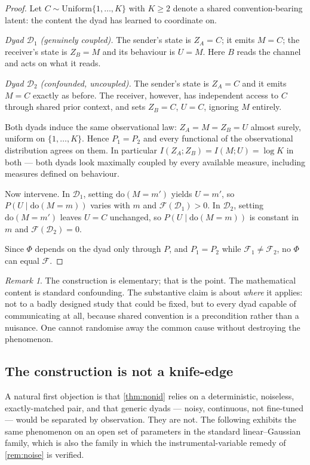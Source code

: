 \documentclass[11pt,a4paper]{article}
\theoremstyle{plain}
\theoremstyle{definition}
\theoremstyle{remark}
\newtheorem{remark}[remark]{Remark}
\newcommand{\Fc}{\mathcal{F}}
\newcommand{\Dy}{\mathcal{D}}
\newcommand{\dop}{\mathrm{do}}
\begin{document}
\begin{proof}
Let $C \sim \mathrm{Uniform}\{1,\dots,K\}$ with $K \geq 2$ denote a shared convention-bearing
latent: the content the dyad has learned to coordinate on.

\emph{Dyad $\Dy_1$ (genuinely coupled).} The sender's state is $Z_A = C$; it emits $M = C$;
the receiver's state is $Z_B = M$ and its behaviour is $U = M$. Here $B$ reads the channel and
acts on what it reads.

\emph{Dyad $\Dy_2$ (confounded, uncoupled).} The sender's state is $Z_A = C$ and it emits
$M = C$ exactly as before. The receiver, however, has independent access to $C$ through shared
prior context, and sets $Z_B = C$, $U = C$, ignoring $M$ entirely.

Both dyads induce the same observational law: $Z_A = M = Z_B = U$ almost surely, uniform on
$\{1,\dots,K\}$. Hence $P_1 = P_2$ and every functional of the observational distribution
agrees on them. In particular $I(Z_A;Z_B) = I(M;U) = \log K$ in both --- both dyads look
maximally coupled by every available measure, including measures defined on behaviour.

Now intervene. In $\Dy_1$, setting $\dop(M = m')$ yields $U = m'$, so
$P(U \mid \dop(M{=}m))$ varies with $m$ and $\Fc(\Dy_1) > 0$. In $\Dy_2$, setting
$\dop(M = m')$ leaves $U = C$ unchanged, so $P(U \mid \dop(M{=}m))$ is constant in $m$ and
$\Fc(\Dy_2) = 0$.

Since $\Phi$ depends on the dyad only through $P$, and $P_1 = P_2$ while $\Fc_1 \neq \Fc_2$,
no $\Phi$ can equal $\Fc$.
\end{proof}

\begin{remark}
The construction is elementary; that is the point. The mathematical content is standard
confounding. The substantive claim is about \emph{where} it applies: not to a badly designed
study that could be fixed, but to every dyad capable of communicating at all, because shared
convention is a precondition rather than a nuisance. One cannot randomise away the common
cause without destroying the phenomenon.
\end{remark}

\subsection{The construction is not a knife-edge}\label{sec:generic}

A natural first objection is that \cref{thm:nonid} relies on a deterministic, noiseless,
exactly-matched pair, and that generic dyads --- noisy, continuous, not fine-tuned --- would
be separated by observation. They are not. The following exhibits the same phenomenon on an
open set of parameters in the standard linear--Gaussian family, which is also the family in
which the instrumental-variable remedy of \cref{rem:noise} is verified.
\end{document}
